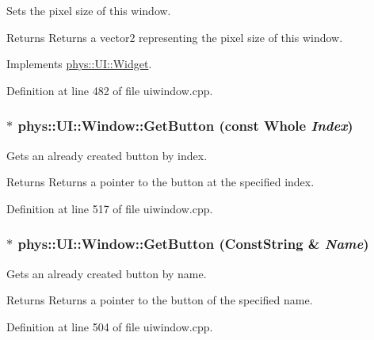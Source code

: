 Sets the pixel size of this window. 

\begin{DoxyReturn}{Returns}
Returns a vector2 representing the pixel size of this window. 
\end{DoxyReturn}


Implements \hyperlink{classphys_1_1UI_1_1Widget_af3a685621ed220748c0940ea38c96ed2}{phys::UI::Widget}.



Definition at line 482 of file uiwindow.cpp.

\hypertarget{classphys_1_1UI_1_1Window_a1ec54b75619613e173509bd4d5533171}{
\subsubsection[{GetButton}]{ $\ast$ phys::UI::Window::GetButton (const {\bf Whole} {\em Index})}}
\label{d4/d86/classphys_1_1UI_1_1Window_a1ec54b75619613e173509bd4d5533171}


Gets an already created button by index. 

\begin{DoxyReturn}{Returns}
Returns a pointer to the button at the specified index. 
\end{DoxyReturn}


Definition at line 517 of file uiwindow.cpp.

\hypertarget{classphys_1_1UI_1_1Window_ab1152992cf6b636c8a4911889d930d9a}{
\subsubsection[{GetButton}]{ $\ast$ phys::UI::Window::GetButton ({\bf ConstString} \& {\em Name})}}
\label{d4/d86/classphys_1_1UI_1_1Window_ab1152992cf6b636c8a4911889d930d9a}


Gets an already created button by name. 

\begin{DoxyReturn}{Returns}
Returns a pointer to the button of the specified name. 
\end{DoxyReturn}


Definition at line 504 of file uiwindow.cpp.

